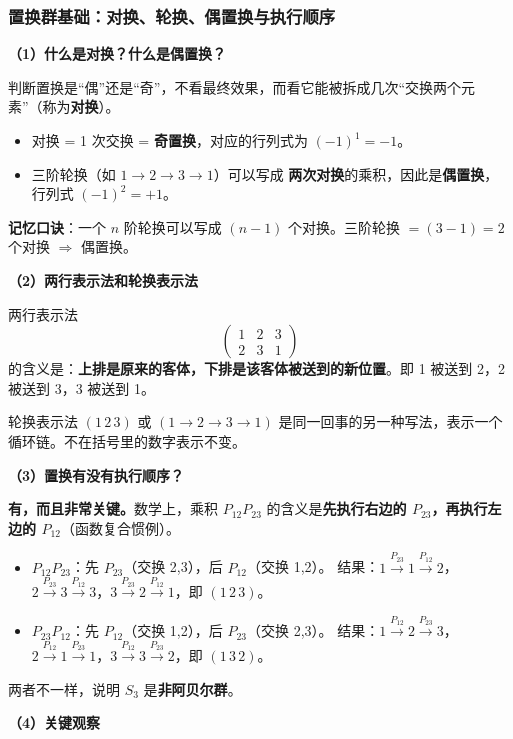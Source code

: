 \subsubsection*{置换群基础：对换、轮换、偶置换与执行顺序}

\textbf{（1）什么是对换？什么是偶置换？}

判断置换是``偶''还是``奇''，不看最终效果，而看它能被拆成几次``交换两个元素''（称为\textbf{对换}）。
\begin{itemize}[nosep]
    \item 对换 = 1 次交换 = \textbf{奇置换}，对应的行列式为 $(-1)^1 = -1$。
    \item 三阶轮换（如 $1\to2\to3\to1$）可以写成 \textbf{两次对换}的乘积，因此是\textbf{偶置换}，行列式 $(-1)^2 = +1$。
\end{itemize}

\textbf{记忆口诀}：一个 $n$ 阶轮换可以写成 $(n-1)$ 个对换。三阶轮换 $=(3-1)=2$ 个对换 $\Rightarrow$ 偶置换。

\textbf{（2）两行表示法和轮换表示法}

两行表示法
\[
\begin{pmatrix} 1 & 2 & 3 \\ 2 & 3 & 1 \end{pmatrix}
\]
的含义是：\textbf{上排是原来的客体，下排是该客体被送到的新位置}。即 1 被送到 2，2 被送到 3，3 被送到 1。

轮换表示法 $(1\,2\,3)$ 或 $(1\to2\to3\to1)$ 是同一回事的另一种写法，表示一个循环链。不在括号里的数字表示不变。

\textbf{（3）置换有没有执行顺序？}

\textbf{有，而且非常关键。}数学上，乘积 $P_{12}P_{23}$ 的含义是\textbf{先执行右边的 $P_{23}$，再执行左边的 $P_{12}$}（函数复合惯例）。
\begin{itemize}[nosep]
    \item $P_{12}P_{23}$：先 $P_{23}$（交换 2,3），后 $P_{12}$（交换 1,2）。
    结果：$1\xrightarrow{P_{23}}1\xrightarrow{P_{12}}2$，$2\xrightarrow{P_{23}}3\xrightarrow{P_{12}}3$，$3\xrightarrow{P_{23}}2\xrightarrow{P_{12}}1$，即 $(1\,2\,3)$。
    \item $P_{23}P_{12}$：先 $P_{12}$（交换 1,2），后 $P_{23}$（交换 2,3）。
    结果：$1\xrightarrow{P_{12}}2\xrightarrow{P_{23}}3$，$2\xrightarrow{P_{12}}1\xrightarrow{P_{23}}1$，$3\xrightarrow{P_{12}}3\xrightarrow{P_{23}}2$，即 $(1\,3\,2)$。
\end{itemize}
两者不一样，说明 $S_3$ 是\textbf{非阿贝尔群}。

\textbf{（4）关键观察}

